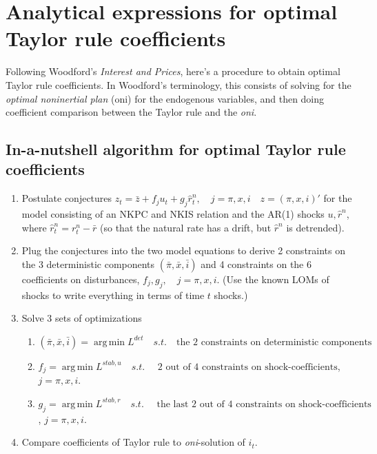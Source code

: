 \documentclass[11pt]{article}
\renewcommand{\[}{\begin{equation}}
\renewcommand{\]}{\end{equation}}
\DeclareMathOperator{\argmin}{arg\,min}
\begin{document}
\newpage
\section{Analytical expressions for optimal Taylor rule coefficients}
Following Woodford's \emph{Interest and Prices}, here's a procedure to obtain optimal Taylor rule coefficients. In Woodford's terminology, this consists of solving for the \emph{optimal noninertial plan} (oni) for the endogenous variables,  and then doing coefficient comparison between the Taylor rule and the \emph{oni}.
\subsection{In-a-nutshell algorithm for optimal Taylor rule coefficients}
\begin{enumerate}
\item Postulate conjectures $z_t = \bar{z} +f_ju_t + g_j \hat{r}_t^n, \quad j=\pi,x,i \quad z=(\pi,x,i)'$ for the model consisting of an NKPC and NKIS relation and the AR(1) shocks $u, \hat{r}^n$, where $\hat{r}_t^n = r^n_t - \bar{r}$ (so that the natural rate has a drift, but $\hat{r}^n$ is detrended).
\item Plug the conjectures into the two model equations to derive 2 constraints on the 3 deterministic components $(\bar{\pi}, \bar{x}, \bar{i})$ and 4 constraints on the 6 coefficients on disturbances, $f_j, g_j, \quad j=\pi,x,i$. (Use the known LOMs of shocks to write everything in terms of time $t$ shocks.)
\item Solve 3 sets of optimizations
\begin{enumerate}
\item $(\bar{\pi}, \bar{x}, \bar{i}) = \argmin L^{det} \quad s.t.\quad  \text{the 2 constraints on deterministic components}$
\item $f_j = \argmin L^{stab,u} \quad s.t.\quad  \text{ 2 out of 4 constraints on shock-coefficients}$, $j=\pi,x,i$. 
\item $g_j = \argmin L^{stab,r} \quad s.t.\quad  \text{ the last 2 out of 4 constraints on shock-coefficients}$, $j=\pi,x,i$. 
\end{enumerate}
\item Compare coefficients of Taylor rule to \emph{oni}-solution of $i_t$.
\end{enumerate}
\end{document}
